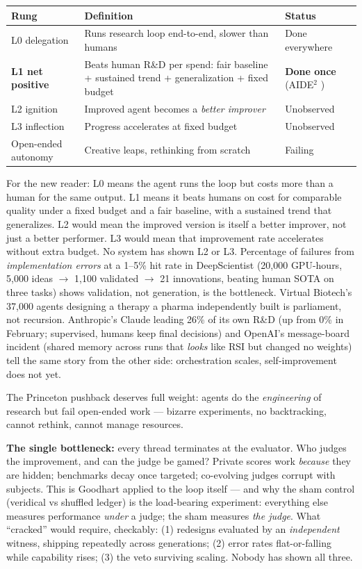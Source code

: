 \begin{center}
\small
\begin{tabular}{p{2.6cm}p{4.4cm}p{5.4cm}}
\toprule
Rung & Definition & Status \\
\midrule
L0 delegation & Runs research loop end-to-end, slower than humans & Done everywhere \\
\textbf{L1 net positive} & Beats human R\&D per spend: fair baseline + sustained trend + generalization + fixed budget & \textbf{Done once} (AIDE$^{2}$ \cite{weco2026}) \\
L2 ignition & Improved agent becomes a \emph{better improver} & Unobserved \\
L3 inflection & Progress accelerates at fixed budget & Unobserved \\
Open-ended autonomy & Creative leaps, rethinking from scratch & Failing \cite{kapoor2026} \\
\bottomrule
\end{tabular}
\end{center}

For the new reader: L0 means the agent runs the loop but costs more than a human for the same output. L1 means it beats humans on cost for comparable quality under a fixed budget and a fair baseline, with a sustained trend that generalizes. L2 would mean the improved version is itself a better improver, not just a better performer. L3 would mean that improvement rate accelerates without extra budget. No system has shown L2 or L3. Percentage of failures from \emph{implementation errors} at a 1--5\% hit rate in DeepScientist (20,000 GPU-hours, 5,000 ideas $\to$ 1,100 validated $\to$ 21 innovations, beating human SOTA on three tasks) shows validation, not generation, is the bottleneck. Virtual Biotech's 37,000 agents designing a therapy a pharma independently built is parliament, not recursion. Anthropic's Claude leading 26\% of its own R\&D \cite{anthropic2026} (up from 0\% in February; supervised, humans keep final decisions) and OpenAI's message-board incident (shared memory across runs that \emph{looks} like RSI but changed no weights) tell the same story from the other side: orchestration scales, self-improvement does not yet.

The Princeton pushback \cite{kapoor2026} deserves full weight: agents do the \emph{engineering} of research but fail open-ended work --- bizarre experiments, no backtracking, cannot rethink, cannot manage resources.

\textbf{The single bottleneck:} every thread terminates at the evaluator. Who judges the improvement, and can the judge be gamed? Private scores work \emph{because} they are hidden; benchmarks decay once targeted; co-evolving judges corrupt with subjects. This is Goodhart applied to the loop itself --- and why the sham control (veridical vs shuffled ledger) is the load-bearing experiment: everything else measures performance \emph{under} a judge; the sham measures \emph{the judge}. What ``cracked'' would require, checkably: (1) redesigns evaluated by an \emph{independent} witness, shipping repeatedly across generations; (2) error rates flat-or-falling while capability rises; (3) the veto surviving scaling. Nobody has shown all three.


